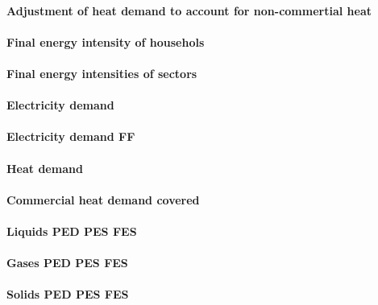\paragraph{Adjustment of heat demand to account for non-commertial heat}
\paragraph{Final energy intensity of househols}
\paragraph{Final energy intensities of sectors}
\paragraph{Electricity demand}
\paragraph{Electricity demand FF}
\paragraph{Heat demand}
\paragraph{Commercial heat demand covered}
\paragraph{Liquids PED PES FES}
\paragraph{Gases PED PES FES}
\paragraph{Solids PED PES FES}


